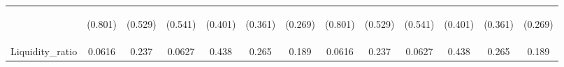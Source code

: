 \documentclass[]{article}
\begin{document}
\begin{center}
\begin{tabular}{lcccccccccccc}
\vspace{4pt} & \begin{footnotesize}(0.801)\end{footnotesize} & \begin{footnotesize}(0.529)\end{footnotesize} & \begin{footnotesize}(0.541)\end{footnotesize} & \begin{footnotesize}(0.401)\end{footnotesize} & \begin{footnotesize}(0.361)\end{footnotesize} & \begin{footnotesize}(0.269)\end{footnotesize} & \begin{footnotesize}(0.801)\end{footnotesize} & \begin{footnotesize}(0.529)\end{footnotesize} & \begin{footnotesize}(0.541)\end{footnotesize} & \begin{footnotesize}(0.401)\end{footnotesize} & \begin{footnotesize}(0.361)\end{footnotesize} & \begin{footnotesize}(0.269)\end{footnotesize} \\
Liquidity\_ratio & 0.0616 & 0.237 & 0.0627 & 0.438 & 0.265 & 0.189 & 0.0616 & 0.237 & 0.0627 & 0.438 & 0.265 & 0.189 \\

\end{tabular}
\end{center}
\end{document}
